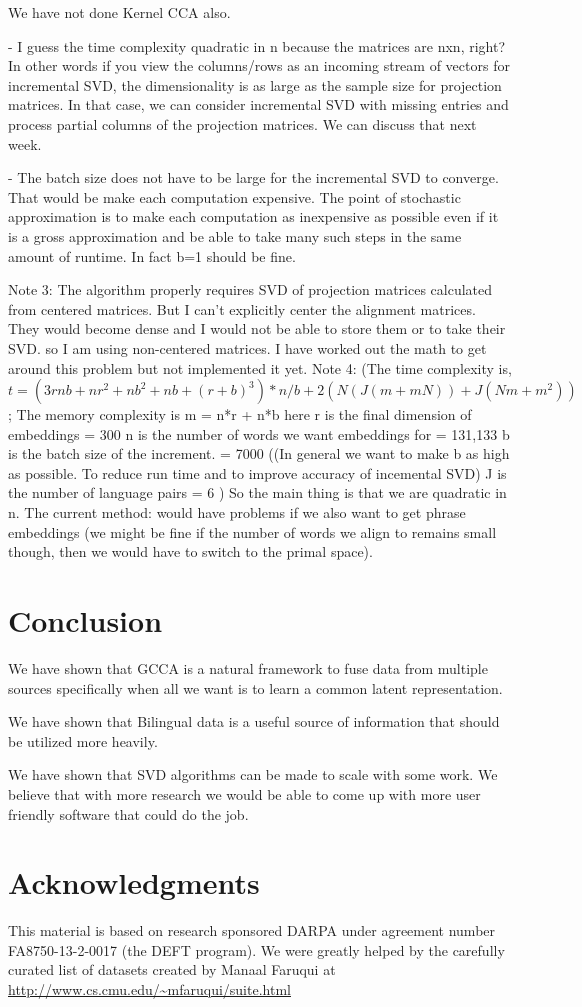 \documentclass[11pt]{article}
\begin{document}
We have not done Kernel CCA also.

- I guess the time complexity quadratic in n because the matrices are nxn, right? In other words if you view the columns/rows as an incoming stream of vectors for incremental SVD, the dimensionality is as large as the sample size for projection matrices. In that case, we can consider incremental SVD with missing entries and process partial columns of the projection matrices. We can discuss that next week. 

- The batch size does not have to be large for the incremental SVD to
converge. That would be make each computation expensive. The point of
stochastic approximation is to make each computation as inexpensive as
possible even if it is a gross approximation and be able to take many
such steps in the same amount of runtime. In fact b=1 should be fine.

Note 3: The algorithm properly requires SVD of projection matrices calculated from centered matrices. But I can't explicitly center the alignment matrices. They would become dense and I would not be able to store them or to take their SVD. so I am using non-centered matrices. I have worked out the math to get around this problem but not implemented it yet. 
Note 4:  (The time complexity is,  $t =  (3rnb + nr^2 + nb^2 + nb + (r+b)^3)*n/b + 2 (N(J(m + mN)) + J(Nm + m^2))$;
  The memory complexity is m =  n*r + n*b 
  here r is the final dimension of embeddings = 300
n is the number of words we want embeddings for = 131,133
b is the batch size of the increment. = 7000 ((In general we want to make b as high as possible. To reduce run time and to improve accuracy of incemental SVD)
J is the number of language pairs = 6 )
So the main thing is that we are quadratic in n.  The current method:
would have problems if we also want to get phrase embeddings (we might
be fine if the number of words we align to remains small though, then
we would have to switch to the primal space).


\section{Conclusion}
We have shown that GCCA is a natural framework to fuse data from
multiple sources specifically when all we want is to learn a common
latent representation.

We have shown that Bilingual data is a useful source of information
that should be utilized more heavily.

We have shown that SVD algorithms can be made to scale with some
work. We believe that with more research we would be able to come up
with more user friendly software that could do the job. 

\section*{Acknowledgments}
This material is based on research sponsored DARPA under agreement
number FA8750-13-2-0017 (the DEFT program). We were greatly helped by
the carefully curated list of datasets created by Manaal Faruqui at \url{http://www.cs.cmu.edu/~mfaruqui/suite.html}



\end{document}
